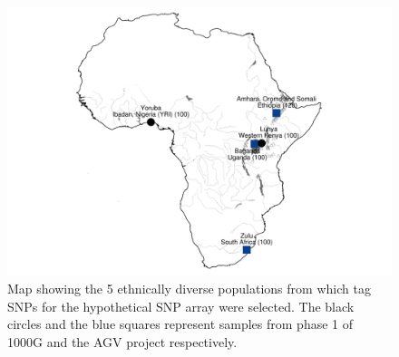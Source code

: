 \begin{figure}[htp]
\centering
\includegraphics{fig/afr5pop}
\caption[Map showing 5 populations from which tag SNPs were selected.]{Map showing the 5 ethnically diverse populations from which tag SNPs for the hypothetical SNP array were selected. The black circles and the blue squares represent samples from phase 1 of \gls{1000G}\cite{1000G2012} and the \gls{AGV} project\cite{Gurdasani2015} respectively.}
\label{fig:imp_accu_allele}
\end{figure}